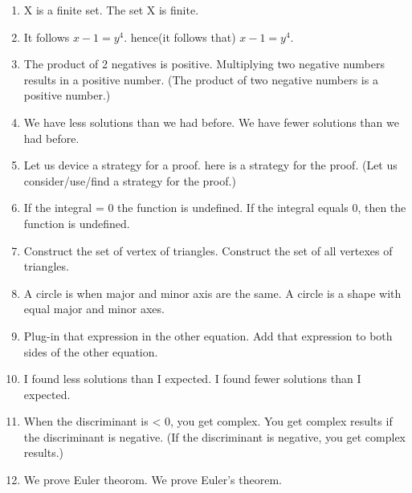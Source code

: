 \documentclass[11pt]{article}
\begin{document}
\begin{enumerate}
	\item
	X is a finite set. \textrightarrow \hspace*{0.25cm} The set X is finite.
	\item
	It follows $x-1=y^{4}$. \textrightarrow \hspace*{0.25cm} hence(it follows that) $x-1=y^{4}$.
	\item
	The product of 2 negatives is positive. \textrightarrow \hspace*{0.25cm} Multiplying two negative numbers results in a positive number. (The product of two negative numbers is a positive number.) 
	\item
	We have less solutions than we had before. \textrightarrow \hspace*{0.25cm}	We have fewer solutions than we had before.
	\item
	Let us device a strategy for a proof. \textrightarrow \hspace*{0.25cm} here is a strategy for the proof. (Let us consider/use/find a strategy for the proof.)
	\item
	If the integral = 0 the function is undefined. \textrightarrow \hspace*{0.25cm} If the integral equals 0, then the function is undefined.
	\item
	Construct the set of vertex of triangles. \textrightarrow \hspace*{0.25cm}  Construct the set of all vertexes of triangles.
	\item
	A circle is when major and minor axis are the same. \textrightarrow \hspace*{0.25cm} A circle is a shape with equal major and minor axes.
	\item
	Plug-in that expression in the other equation. \textrightarrow \hspace*{0.25cm} Add that expression to both sides of the other equation.
	\item
	I found less solutions than I expected. \textrightarrow \hspace*{0.25cm} I found fewer solutions than I expected.
	\item
	When the discriminant is < 0, you get complex. \textrightarrow \hspace*{0.25cm} You get complex results if the discriminant is negative. (If the discriminant is negative, you get complex results.)
	\item
	We prove Euler theorom. \textrightarrow \hspace*{0.25cm} We prove Euler's theorem.

\end{enumerate}
\end{document}
